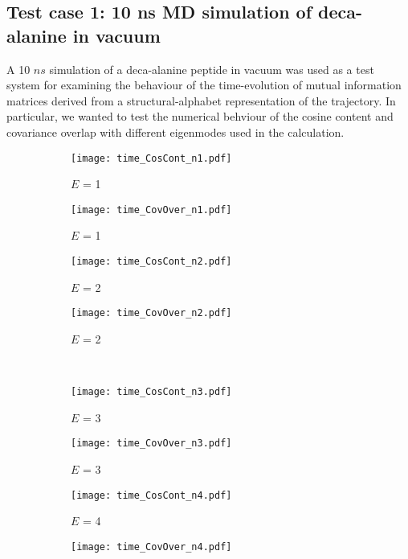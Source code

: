 \documentclass[11pt]{article}
\begin{document}
\subsection*{Test case 1: 10 ns MD simulation of deca-alanine in vacuum}
A 10 $ns$ simulation of a deca-alanine peptide in vacuum was used as a test system for examining the behaviour of the time-evolution of mutual information matrices derived from a structural-alphabet representation of the trajectory. In particular, we wanted to test the numerical behviour of the cosine content and covariance overlap with different eigenmodes used in the calculation. 
\begin{figure}[hbt]
\centering
\begin{subfigure}[b]{.24\linewidth}
    \centering
    \texttt{[image: time\_CosCont\_n1.pdf]}
    \caption{$E$ = 1}\label{fig:1a}
  \end{subfigure}%
  \begin{subfigure}[b]{.24\linewidth}
    \centering
    \texttt{[image: time\_CovOver\_n1.pdf]}
    \caption{$E$ = 1}\label{fig:1b}
  \end{subfigure}%
  \begin{subfigure}[b]{.24\linewidth}
    \centering
    \texttt{[image: time\_CosCont\_n2.pdf]}
    \caption{$E$ = 2}\label{fig:1c}
  \end{subfigure}%
  \begin{subfigure}[b]{.24\linewidth}
    \centering
    \texttt{[image: time\_CovOver\_n2.pdf]}
    \caption{$E$ = 2}\label{fig:1d}
  \end{subfigure}\\%
  \begin{subfigure}[b]{.24\linewidth}
    \centering
    \texttt{[image: time\_CosCont\_n3.pdf]}
    \caption{$E$ = 3}\label{fig:1e}
  \end{subfigure}%
  \begin{subfigure}[b]{.24\linewidth}
    \centering
    \texttt{[image: time\_CovOver\_n3.pdf]}
    \caption{$E$ = 3}\label{fig:1f}
  \end{subfigure}%
  \begin{subfigure}[b]{.24\linewidth}
    \centering
    \texttt{[image: time\_CosCont\_n4.pdf]}
    \caption{$E$ = 4}\label{fig:1g}
  \end{subfigure}%
  \begin{subfigure}[b]{.24\linewidth}
    \centering
    \texttt{[image: time\_CovOver\_n4.pdf]}

\end{subfigure}
\end{figure}
\end{document}
